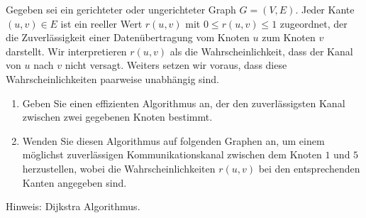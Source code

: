 
\begin{exercise}

Gegeben sei ein gerichteter oder ungerichteter Graph $G = (V, E)$.
Jeder Kante $(u, v) \in E$ ist ein reeller Wert $r(u, v)$ mit $0 \leq r(u, v) \leq 1$ zugeordnet, der die Zuverlässigkeit einer Datenübertragung vom Knoten $u$ zum Knoten $v$ darstellt.
Wir interpretieren $r(u, v)$ als die Wahrscheinlichkeit, dass der Kanal von $u$ nach $v$ nicht versagt.
Weiters setzen wir voraus, dass diese Wahrscheinlichkeiten paarweise unabhängig sind.

\begin{enumerate}[label = \alph*]
    \item Geben Sie einen effizienten Algorithmus an, der den zuverlässigsten Kanal zwischen zwei gegebenen Knoten bestimmt.
    \item Wenden Sie diesen Algorithmus auf folgenden Graphen an, um einem möglichst zuverlässigen Kommunikationskanal zwischen dem Knoten $1$ und $5$ herzustellen, wobei die Wahrscheinlichkeiten $r(u, v)$ bei den entsprechenden Kanten angegeben sind.
\end{enumerate}

Hinweis:
Dijkstra Algorithmus.

\begin{center}
    
\end{center}

\end{exercise}


